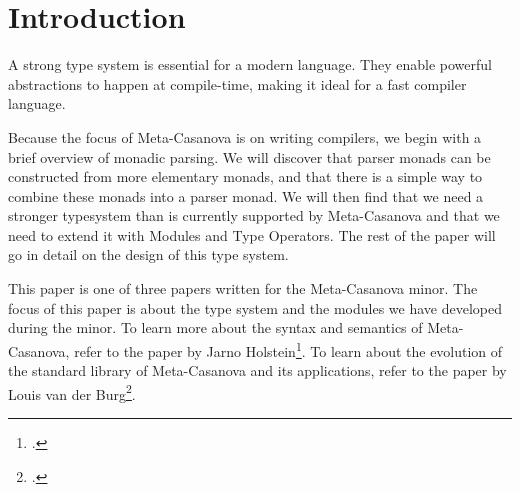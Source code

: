 \section{Introduction}
\begin{multicols*}{2}\noindent
A strong type system is essential for a modern language.
They enable powerful abstractions to happen at compile-time,
making it ideal for a fast compiler language.

Because the focus of Meta-Casanova is on writing compilers,
we begin with a brief overview of monadic parsing.
We will discover that parser monads can be constructed from more elementary monads,
and that there is a simple way to combine these monads into a parser monad.
We will then find that we need a stronger typesystem than is currently supported by Meta-Casanova
and that we need to extend it with Modules and Type Operators.
The rest of the paper will go in detail on the design of this type system.

This paper is one of three papers written for the Meta-Casanova minor.
The focus of this paper is about the type system and the modules we have developed during the minor.
To learn more about the syntax and semantics of Meta-Casanova, refer to the paper by Jarno Holstein\footcite{holstein16}.
To learn about the evolution of the standard library of Meta-Casanova and its applications, refer to the paper by Louis van der Burg\footcite{vanderburg16}.
\end{multicols*}
